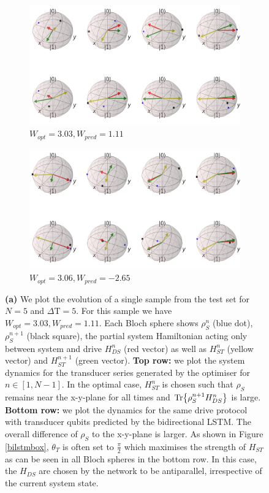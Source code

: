 \newpage

\begin{figure}[H]
	\centering
	\begin{subfigure}{0.85\textwidth}
		\centering
		\includegraphics[width=\textwidth]{img/bloch_10553_crop_sphere}
		\caption{$W_{opt} = 3.03, W_{pred} = 1.11$}
		\label{bloch_10553}
	\end{subfigure}
	\begin{subfigure}{0.85\textwidth}
		\centering
		\includegraphics[width=\textwidth]{img/bloch_worst_crop_sphere}
		\caption{$W_{opt} = 3.06, W_{pred} = -2.65$}
		\label{bloch_worst}
	\end{subfigure}
	\caption{\textbf{(a)} We plot the evolution of a single sample from the test set for $N=5$ and $\Delta \mathrm{T} = 5$. For this sample we have $W_{opt} = 3.03, W_{pred} = 1.11$. Each Bloch sphere shows $\rho_S^n$ (blue dot), $\rho_S^{n+1}$ (black square), the partial system Hamiltonian acting only between system and drive $H_{DS}^n$ (red vector) as well as $H_{ST}^n$ (yellow vector) and $H_{ST}^{n+1}$ (green vector). \textbf{Top row:} we plot the system dynamics for the transducer series generated by the optimiser for $n \in [1, N - 1]$. In the optimal case, $H_{ST}^n$ is chosen such that $\rho_S$ remains near the x-y-plane for all times and $\Tr{\rho_S^{n+1} H_{DS}^n}$ is large. \textbf{Bottom row:} we plot the dynamics for the same drive protocol with transducer qubits predicted by the bidirectional LSTM. The overall difference of $\rho_S$ to the x-y-plane is larger. As shown in Figure \ref{bilstmbox}, $\theta_T$ is often set to $\frac{\pi}{2}$ which maximises the strength of $H_{ST}$ as can be seen in all Bloch spheres in the bottom row. In this case, the $H_{DS}$ are chosen by the network to be antiparallel, irrespective of the current system state.
}
\end{figure}
